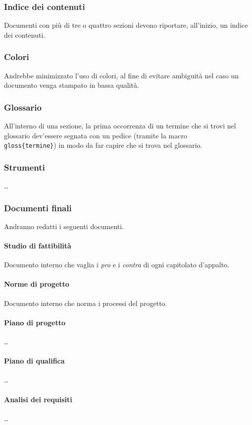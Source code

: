\subsubsection{Indice dei contenuti} Documenti con più di tre o quattro sezioni devono riportare, all'inizio, un indice dei contenuti.

\subsubsection{Colori} Andrebbe minimizzato l'uso di colori, al fine di evitare ambiguità nel caso un documento venga stampato in bassa qualità.

\subsubsection{Glossario} All'interno di una sezione, la prima occorrenza di un termine che si trovi nel glossario dev'essere segnata con un pedice (tramite la macro \texttt{\\gloss\{termine\}}) in modo da far capire che si trova nel glossario.

\subsubsection{Strumenti} \dots

\subsubsection{Documenti finali} Andranno redatti i seguenti documenti.
\paragraph{Studio di fattibilità} Documento interno che vaglia i \emph{pro} e i \emph{contra} di ogni capitolato d'appalto.
\paragraph{Norme di progetto} Documento interno che norma i processi del progetto.
\paragraph{Piano di progetto} \dots
\paragraph{Piano di qualifica} \dots
\paragraph{Analisi dei requisiti} \dots
